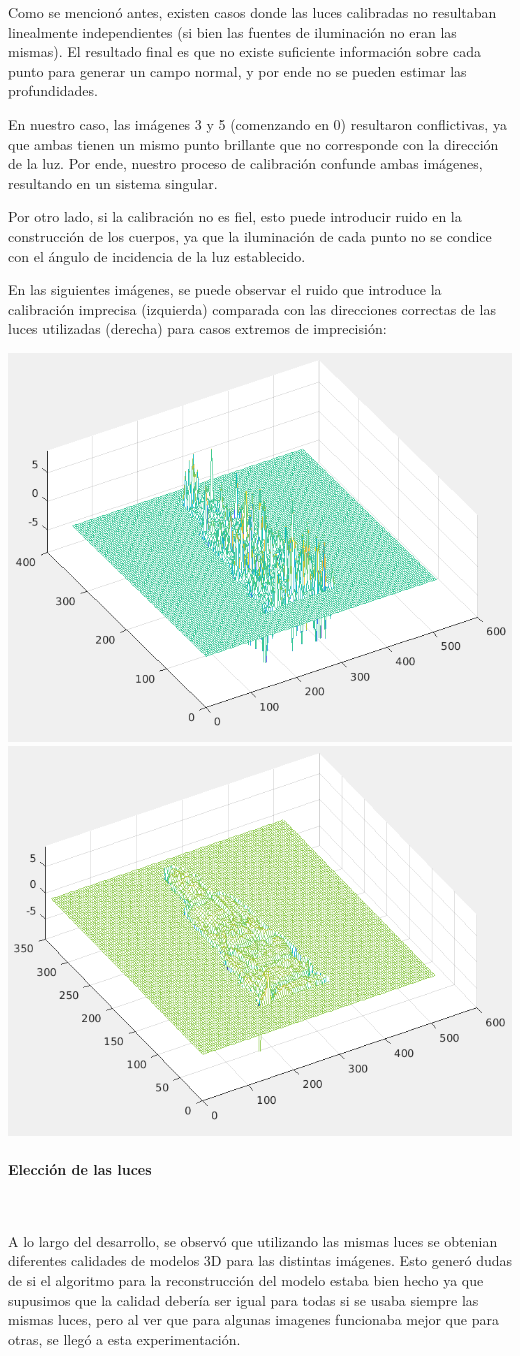 Como se mencionó antes, existen casos donde las luces calibradas no resultaban
linealmente independientes (si bien las fuentes de iluminación no eran las mismas).
El resultado final es que no existe suficiente información sobre cada punto
para generar un campo normal, y por ende no se pueden estimar las profundidades.

En nuestro caso, las imágenes 3 y 5 (comenzando en 0) resultaron conflictivas,
ya que ambas tienen un mismo punto brillante que no corresponde con la dirección
de la luz. Por ende, nuestro proceso de calibración confunde ambas imágenes,
resultando en un sistema singular.

Por otro lado, si la calibración no es fiel, esto puede introducir ruido en
la construcción de los cuerpos, ya que la iluminación de cada punto no
se condice con el ángulo de incidencia de la luz establecido.

En las siguientes imágenes, se puede observar el ruido que introduce la calibración
imprecisa (izquierda) comparada con las direcciones correctas de las luces utilizadas
(derecha) para casos extremos de imprecisión:

\begin{center}
\includegraphics[width=.4\linewidth]{imagenes/calib-ruido.png}
\includegraphics[width=.4\linewidth]{imagenes/luces-limpio.png}
\end{center}

\paragraph{Elección de las luces}
\

A lo largo del desarrollo, se observó que utilizando las mismas luces se obtenian diferentes calidades de modelos 3D para las distintas imágenes. Esto generó dudas de si el algoritmo para la reconstrucción del modelo estaba bien hecho ya que supusimos que la calidad debería ser igual para todas si se usaba siempre las mismas luces, pero al ver que para algunas imagenes funcionaba mejor que para otras, se llegó a esta experimentación.


